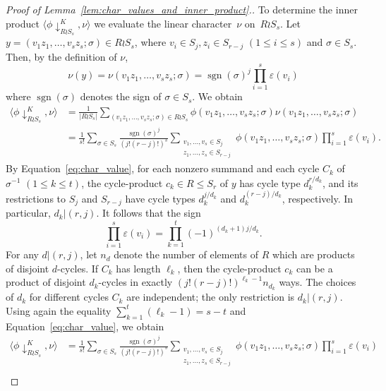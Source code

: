 \documentclass[10pt]{article}
\theoremstyle{definition}
\DeclareMathOperator\sgn{sgn}
\begin{document}
\begin{proof}[Proof of  Lemma~\ref{lem:char_values_and_inner_product}.]
    To determine the inner product $\langle \phi\downarrow_{R\wr S_{s}}^K,\nu\rangle$ we evaluate the linear character~$\nu$ on~$R\wr S_{s}$.
    Let $y = (v_1z_1,\ldots, v_sz_s; \sigma)\in R\wr S_s$, 
    where $v_i\in S_j, z_i\in S_{r-j}$ $(1 \le i \le s)$ and $\sigma\in S_s$. Then, by the definition of $\nu$,
    \[
        \nu(y)
        = \nu(v_1z_1,\ldots, v_sz_s; \sigma)
        = \sgn(\sigma)^j 
        \prod_{i=1}^s \varepsilon(v_i)
    \]
    where $\sgn(\sigma)$ denotes the sign of $\sigma \in S_s$.
    We obtain
    \begin{align*}
        \langle \phi\downarrow_{R\wr S_{s}}^K,\nu\rangle
        &= \frac{1}{|R\wr S_{s}|}
        \sum_{(v_1 z_1,\ldots,v_s z_s;\sigma) \in R\wr S_{s}} 
        \phi(v_1 z_1,\ldots,v_s z_s;\sigma)
        \nu(v_1 z_1,\ldots,v_s z_s;\sigma) \\
        &= \frac{1}{s!} \sum_{\sigma\in S_s} 
        \frac{\sgn(\sigma)^j}{(j!(r-j)!)^s} 
        \sum_{\substack{v_1,\ldots ,v_s \in S_j \\ z_1,\ldots, z_s \in S_{r-j}}}
        \phi(v_1z_1,\ldots,v_sz_s;\sigma)
        \prod_{i=1}^s \varepsilon(v_i).
    \end{align*}
    By Equation~\eqref{eq:char_value},
    for each nonzero summand and each cycle $C_k$ of $\sigma^{-1}$ $(1 \le k \le t)$,
    the cycle-product $c_k \in R \le S_r$ of $y$ has cycle type $d_k^{r/d_k}$, and its restrictions to $S_j$ and $S_{r-j}$ have cycle types $d_k^{j/{d_k}}$ and $d_k^{(r-j)/{d_k}}$, respectively. 
    In particular, $d_k | (r,j)$.
    It follows that the sign
    \[
        \prod_{i=1}^s \varepsilon(v_i)
        = \prod_{k=1}^{t} (-1)^{(d_k+1)j/d_k}. 
    \]
    For any $d | (r,j)$, 
    let $n_d$ denote the number of elements of $R$ which are products of disjoint $d$-cycles. 
    If $C_k$ has length $\ell_k$, then 
    the cycle-product $c_k$ can be a product of disjoint $d_k$-cycles in exactly $(j!(r-j)!)^{\ell_k-1}n_{d_k}$ ways.
    The choices of $d_k$ for different cycles $C_k$  are independent; the only restriction is $d_k|(r,j)$. 
    Using again the equality $\sum_{k=1}^{t} (\ell_k - 1) = s-t$ and Equation~\eqref{eq:char_value}, 
    we obtain 
    \begin{align*}
        \langle \phi\downarrow_{R\wr S_{s}}^K,\nu \rangle
        &= \frac{1}{s!} \sum_{\sigma\in S_s} 
        \frac{\sgn(\sigma)^j}{(j!(r-j)!)^s} 
        \sum_{\substack{v_1,\ldots ,v_s \in S_j \\ z_1,\ldots, z_s \in S_{r-j}}} 
        \phi(v_1z_1,\ldots,v_sz_s;\sigma) 
        \prod_{i=1}^s \varepsilon(v_i) \\

\end{align*}
\end{proof}
\end{document}
